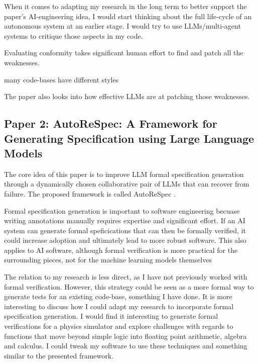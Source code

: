 \documentclass{article}
\begin{document}
When it comes to adapting my research in the long term to better support the paper's AI-engineering idea, I would start thinking about the full life-cycle of an autonomous system at an earlier stage. I would try to use LLMs/multi-agent systems to critique those aspects in my code.


Evaluating conformity takes significant human effort to find and patch all the weaknesses.

many code-bases have different styles

The paper also looks into how effective LLMs are at patching those weaknesses.


\subsection{Paper 2: AutoReSpec: A Framework for Generating Specification using Large Language Models}
The core idea of this paper is to improve LLM formal specification generation through a dynamically chosen collaborative pair of LLMs that can recover from failure. The proposed framework is called AutoReSpec \cite{ayon2026autorespec}.

Formal specification generation is important to software engineering becuase writing annotations manually requires expertise and significant effort. 
If an AI system can generate formal speficications that can then be formally verified, it could increase adoption and ultimately lead to more robust software. 
This also applies to AI software, although formal verification is more practical for the surrounding pieces, not for the machine learning models themselves

The relation to my research is less direct, as I have not previously worked with formal verification.
However, this strategy could be seen as a more formal way to generate tests for an existing code-base, something I have done. 
It is more interesting to discuss how I could adapt my research to incorporate formal specification generation.
I would find it interesting to generate formal verifications for a physics simulator and explore challenges with regards to functions that move beyond simple logic into floating point arithmetic, algebra and calculus.
I could tweak my software to use these techniques and something similar to the presented framework.
\end{document}
